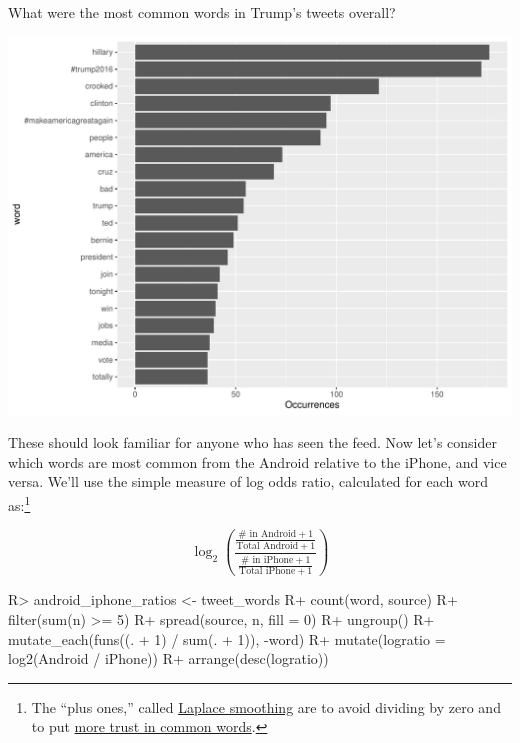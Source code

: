 \documentclass[
]{jss}
\begin{document}
What were the most common words in Trump's tweets overall?

\begin{CodeChunk}


\begin{center}\includegraphics{Live_Demo2_files/figure-latex/tweet_words_plot-1} \end{center}

\end{CodeChunk}

These should look familiar for anyone who has seen the feed. Now let's
consider which words are most common from the Android relative to the
iPhone, and vice versa. We'll use the simple measure of log odds ratio,
calculated for each word as:\footnote{The ``plus ones,'' called
  \href{https://en.wikipedia.org/wiki/Additive_smoothing}{Laplace
  smoothing} are to avoid dividing by zero and to put
  \href{http://varianceexplained.org/r/empirical_bayes_baseball/}{more
  trust in common words}.}

\[\log_2(\frac{\frac{\mbox{\#\ in Android} + 1}{\mbox{Total Android} + 1}}
  {\frac{\mbox{\#\ in iPhone} + 1}{\mbox{Total iPhone} + 1}})\]

\begin{CodeChunk}

\begin{CodeInput}
R> android_iphone_ratios <- tweet_words %
R+   count(word, source) %
R+   filter(sum(n) >= 5) %
R+   spread(source, n, fill = 0) %
R+   ungroup() %
R+   mutate_each(funs((. + 1) / sum(. + 1)), -word) %
R+   mutate(logratio = log2(Android / iPhone)) %
R+   arrange(desc(logratio))
\end{CodeInput}
\end{CodeChunk}
\end{document}
